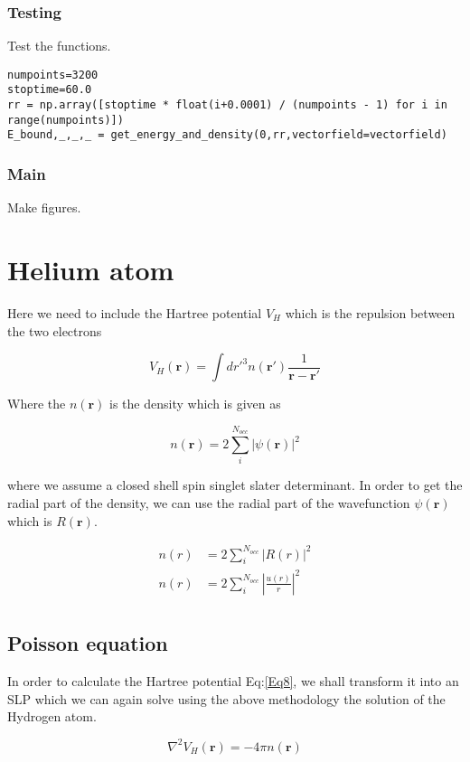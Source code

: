 \documentclass[11pt,a4paper]{article}
\begin{document}
\subsubsection{Testing}
\label{sec:orgcb18275}
Test the functions.
\begin{verbatim}
numpoints=3200
stoptime=60.0
rr = np.array([stoptime * float(i+0.0001) / (numpoints - 1) for i in range(numpoints)])
E_bound,_,_,_ = get_energy_and_density(0,rr,vectorfield=vectorfield)
\end{verbatim}
\subsubsection{Main}
\label{sec:orgd0163e1}
Make figures.

\section{Helium atom}
\label{sec:org546e85b}
Here we need to include the Hartree potential \(V_H\) which is the
repulsion between the two electrons

\[
V_H(\mathbf{r}) = \int dr'^3 n(\mathbf{r}')\frac{1}{\mathbf{r}-\mathbf{r}'}
\]

Where the \(n(\mathbf{r})\) is the density which is given as

\[
n(\mathbf{r}) = 2\sum_i^{N_{occ}} |\psi(\mathbf{r})|^2
\]

where we assume a closed shell spin singlet slater determinant.
In order to get the radial part of the density, we can use the
radial part of the wavefunction \(\psi(\mathbf{r})\) which is \(R(\mathbf{r})\).

\begin{align*}
n(r) &= 2\sum_i^{N_{occ}} |R(r)|^2 \\
n(r) &= 2\sum_i^{N_{occ}} \left |\frac{u(r)}{r}\right|^2 \\
\end{align*}


\subsection{Poisson equation}
\label{sec:org46d53c6}

In order to calculate the Hartree potential Eq:\ref{Eq8}, we shall
transform it into an SLP which we can again solve using the
above methodology the solution of the Hydrogen atom.

\[
\nabla^2 V_H(\mathbf{r}) = -4 \pi n(\mathbf{r})
\]
\end{document}
